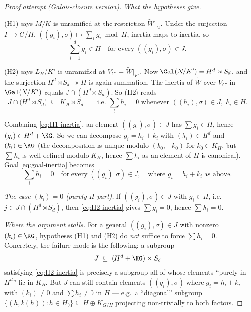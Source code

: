 \begin{proof}[Proof attempt (Galois-closure version)]
\smallskip
\textit{What the hypotheses give.}

(H1) says $M/K$ is unramified at the restriction $\widetilde{W}|_M$. Under
the surjection $\Gamma \to G/H$, $((g_i),\sigma)\mapsto \sum_i g_i \bmod H$,
inertia maps to inertia, so
\begin{equation}\label{eq:H1-inertia}
\sum_{i=1}^d g_i \in H \quad\text{for every } ((g_i),\sigma) \in J.
\end{equation}

(H2) says $L_H/K'$ is unramified at $V_{C'} = \widetilde{W}|_{K'}$. Now
$\Gal(N/K') = H^d \rtimes S_d$, and the surjection
$H^d \rtimes S_d \twoheadrightarrow H$ is again summation. The inertia of
$\widetilde{W}$ over $V_{C'}$ in $\Gal(N/K')$ equals
$J \cap (H^d \rtimes S_d)$. So (H2) reads
\begin{equation}\label{eq:H2-inertia}
J \cap \bigl(H^d \rtimes S_d\bigr) \;\subseteq\; K_H \rtimes S_d
\qquad\text{i.e. } \sum_i h_i = 0 \text{ whenever } ((h_i),\sigma)\in J,\; h_i\in H.
\end{equation}

Combining \eqref{eq:H1-inertia}, an element $((g_i),\sigma)\in J$ has
$\sum g_i \in H$, hence $(g_i) \in H^d + \KG$. So we can decompose
$g_i = h_i + k_i$ with $(h_i) \in H^d$ and $(k_i) \in \KG$ (the decomposition
is unique modulo $(k_0, -k_0)$ for $k_0 \in K_H$, but $\sum h_i$ is well-defined
modulo $K_H$, hence $\sum h_i$ as an element of $H$ is canonical). Goal
\eqref{eq:goal-inertia} becomes
\begin{equation}\label{eq:goal-restate}
\sum_i h_i = 0 \quad\text{for every } ((g_i),\sigma)\in J,
\quad\text{where } g_i = h_i + k_i \text{ as above}.
\end{equation}

\smallskip
\textit{The case $(k_i) = 0$ (purely $H$-part).} If $((g_i),\sigma)\in J$ with
$g_i \in H$, i.e.\ $j \in J \cap (H^d \rtimes S_d)$, then \eqref{eq:H2-inertia}
gives $\sum g_i = 0$, hence $\sum h_i = 0$. \checkmark

\smallskip
\textit{Where the argument stalls.} For a general $((g_i),\sigma)\in J$ with
nonzero $(k_i)\in\KG$, hypotheses (H1) and (H2) do \emph{not} suffice to force
$\sum h_i = 0$. Concretely, the failure mode is the following: a subgroup
\[
J \;\subseteq\; (H^d + \KG)\rtimes S_d
\]
satisfying \eqref{eq:H2-inertia} is precisely a subgroup all of whose elements
``purely in $H^d$'' lie in $K_H$. But $J$ can still contain
elements $((g_i),\sigma)$ where $g_i = h_i + k_i$ with $(k_i)\neq 0$ and
$\sum h_i \neq 0$ in $H$ — e.g.\ a ``diagonal'' subgroup
$\{(h, k(h)) : h \in H_0\} \subseteq H \oplus K_{G/H}$ projecting non-trivially
to both factors.


\end{proof}
